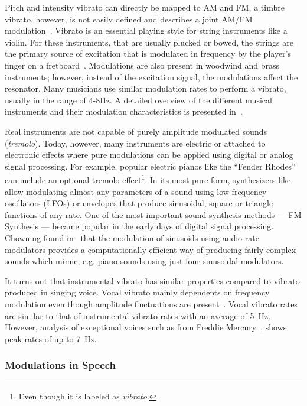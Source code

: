 Pitch and intensity vibrato can directly be mapped to AM and FM, a timbre vibrato, however, is not easily defined and describes a joint AM/FM modulation~\cite{desain99}.
Vibrato is an essential playing style for string instruments like a violin. 
For these instruments, that are usually plucked or bowed, the strings are the primary source of excitation that is modulated in frequency by the player's finger on a fretboard~\cite{macleod06}.
Modulations are also present in woodwind and brass instruments; however, instead of the excitation signal, the modulations affect the resonator.
Many musicians use similar modulation rates to perform a vibrato, usually in the range of 4-8\si{\hertz}.
A detailed overview of the different musical instruments and their modulation characteristics is presented in~\cite{fletcher01}.
\par
Real instruments are not capable of purely amplitude modulated sounds (\emph{tremolo}). 
Today, however, many instruments are electric or attached to electronic effects where pure modulations can be applied using digital or analog signal processing.
For example, popular electric pianos like the ``Fender Rhodes'' can include an optional tremolo effect\footnote{Even though it is labeled as \emph{vibrato}.}.
In its most pure form, synthesizers like~\cite{pinch09, buchla05} allow modulating almost any parameters of a sound using low-frequency oscillators (LFOs) or envelopes that produce sinusoidal, square or triangle functions of any rate.
One of the most important sound synthesis methods --- FM Synthesis --- became popular in the early days of digital signal processing. 
Chowning found in~\cite{chowning73} that the modulation of sinusoids using audio rate modulators provides a computationally efficient way of producing fairly complex sounds which mimic, e.g. piano sounds using just four sinusoidal modulators.
\par
It turns out that instrumental vibrato has similar properties compared to vibrato produced in singing voice.
Vocal vibrato mainly dependents on frequency modulation even though amplitude fluctuations are present~\cite{sundberg94}. 
Vocal vibrato rates are similar to that of instrumental vibrato rates with an average of 5~\si{\hertz}.
However, analysis of exceptional voices such as from Freddie Mercury~\cite{herbst17}, shows peak rates of up to 7~\si{\hertz}.

\subsubsection*{Modulations in Speech}

